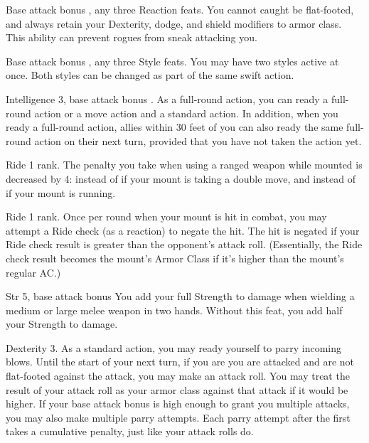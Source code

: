 \featpre Base attack bonus , any three Reaction feats.
\featben You cannot caught be flat-footed, and always retain your Dexterity, dodge, and shield modifiers to armor class. This ability can prevent rogues from sneak attacking you.

\featpre Base attack bonus , any three Style feats.
\featben You may have two styles active at once. Both styles can be changed as part of the same swift action.

\featpre Intelligence 3, base attack bonus .
\featben As a full-round action, you can ready a full-round action or a move action and a standard action. In addition, when you ready a full-round action, allies within 30 feet of you can also ready the same full-round action on their next turn, provided that you have not taken the action yet.

\featpre Ride 1 rank.
 The penalty you take when using a ranged weapon while mounted is decreased by 4:  instead of  if your mount is taking a double move, and  instead of  if your mount is running.

 Ride 1 rank.
 Once per round when your mount is hit in combat, you may attempt a Ride check (as a reaction) to negate the hit. The hit is negated if your Ride check result is greater than the opponent's attack roll. (Essentially, the Ride check result becomes the mount's Armor Class if it's higher than the mount's regular AC.)%

 Str 5, base attack bonus 
 You add your full Strength to damage when wielding a medium or large melee weapon in two hands.
 Without this feat, you add half your Strength to damage.

\featpre Dexterity 3.
\featben As a standard action, you may ready yourself to parry incoming blows. Until the start of your next turn, if you are you are attacked and are not flat-footed against the attack, you may make an attack roll. You may treat the result of your attack roll as your armor class against that attack if it would be higher. If your base attack bonus is high enough to grant you multiple attacks, you may also make multiple parry attempts. Each parry attempt after the first takes a cumulative  penalty, just like your attack rolls do.

